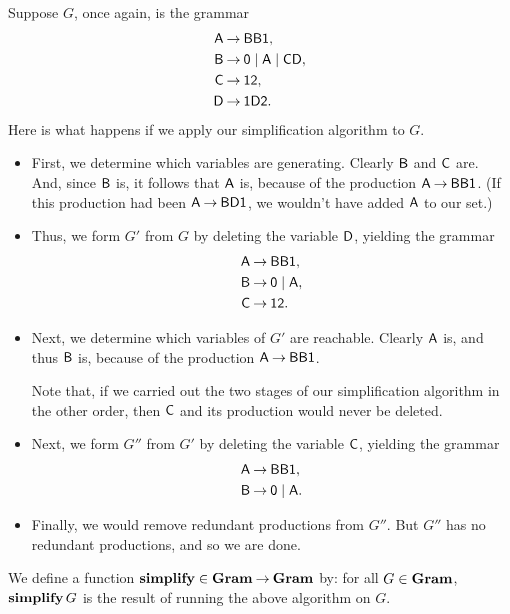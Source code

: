 Suppose $G$, once again, is the grammar
\begin{align*}
\mathsf{A} &\mathbin{\to} \mathsf{BB1}, \\
\mathsf{B} &\mathbin{\to} \mathsf{0}\mid\mathsf{A}\mid\mathsf{C}\mathsf{D}, \\
\mathsf{C} &\mathbin{\to} \mathsf{1}\mathsf{2} , \\
\mathsf{D} &\mathbin{\to} \mathsf{1}\mathsf{D}\mathsf{2} .
\end{align*}
Here is what happens if we apply our simplification algorithm to $G$.
\begin{itemize}
\item First, we determine which variables are generating. Clearly
    $\mathsf{B}$ and $\mathsf{C}$ are.  And, since $\mathsf{B}$ is, it follows that
    $\mathsf{A}$ is, because of the production $\mathsf{A}\mathbin{\to}\mathsf{BB1}$.  (If
    this production had been $\mathsf{A}\mathbin{\to}\mathsf{BD1}$, we wouldn't have
    added $\mathsf{A}$ to our set.)

\item Thus, we form $G'$ from $G$ by deleting the variable $\mathsf{D}$, yielding
  the grammar
  \begin{align*}
    \mathsf{A} &\mathbin{\to} \mathsf{BB1}, \\
    \mathsf{B} &\mathbin{\to} \mathsf{0}\mid\mathsf{A}, \\
    \mathsf{C} &\mathbin{\to} \mathsf{1}\mathsf{2} .
  \end{align*}

\item Next, we determine which variables of $G'$ are reachable.
  Clearly $\mathsf{A}$ is, and thus $\mathsf{B}$ is, because of the production
  $\mathsf{A}\mathbin{\to}\mathsf{BB1}$.

  Note that, if we carried out the two stages of our simplification
  algorithm in the other order, then $\mathsf{C}$ and its production would
  never be deleted.

\item Next, we form $G''$ from $G'$ by deleting the variable $\mathsf{C}$,
  yielding the grammar
  \begin{align*}
    \mathsf{A} &\mathbin{\to} \mathsf{BB1}, \\
    \mathsf{B} &\mathbin{\to} \mathsf{0}\mid\mathsf{A} .
  \end{align*}

\item Finally, we would remove redundant productions from $G''$.
  But $G''$ has no redundant productions, and so we are done.
\end{itemize}

We define a function $\mathbf{simplify}\in\mathbf{Gram}\mathbin{\to}\mathbf{Gram}$ by: for all
$G\in\mathbf{Gram}$, $\mathbf{simplify}\,G$ is the result of running the above
algorithm on $G$.

